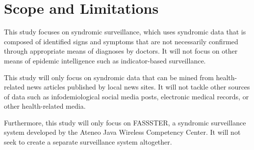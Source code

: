 \section{Scope and Limitations}

This study focuses on syndromic surveillance, which uses syndromic data that is composed of identified signs and symptoms that are not necessarily confirmed through appropriate means of diagnoses by doctors. It will not focus on other means of epidemic intelligence such as indicator-based surveillance. 

This study will only focus on syndromic data that can be mined from health-related news articles published by local news sites. It will not tackle other sources of data such as infodemiological social media posts, electronic medical records, or other health-related media. 

Furthermore, this study will only focus on FASSSTER, a syndromic surveillance system developed by the Ateneo Java Wireless Competency Center. It will not seek to create a separate surveillance system altogether.
